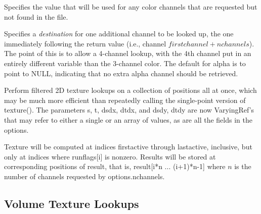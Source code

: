 \vspace{-24pt}
\vspace{10pt}
Specifies the value that will be used for any color channels that are
requested but not found in the file.
\apiend

\vspace{-24pt}
\vspace{10pt}
Specifies a \emph{destination} for one additional channel to be looked
up, the one immediately following the return value (i.e., channel
$\mathit{firstchannel}+\mathit{nchannels}$).  The point of this is to
allow a 4-channel lookup, with the 4th channel put in an entirely
different variable than the 3-channel color.  The default for {\cf
  alpha} is to point to NULL, indicating that no extra alpha channel
should be retrieved.
\apiend

\apiend



Perform filtered 2D texture lookups on a collection of positions all at
once, which may be much more efficient than repeatedly calling the
single-point version of {\cf texture()}.  The parameters {\cf s},
{\cf t}, {\cf dsdx}, {\cf dtdx}, and {\cf dsdy}, {\cf dtdy} are now
{\cf VaryingRef}'s that may refer to either a single or an array of
values, as are all the fields in the {\cf options}.

Texture will be computed at indices {\cf firstactive} through
{\cf lastactive}, inclusive, but only at indices where {\cf runflags[i]}
is nonzero.  Results will be stored at corresponding positions of
{\cf result}, that is, 
{\cf result[i*n ... (i+1)*n-1]} where $n$ is the number of channels
requested by {\cf options.nchannels}.

\apiend

\newpage
\subsection{Volume Texture Lookups}
\label{sec:texturesys:api:texture3d}

